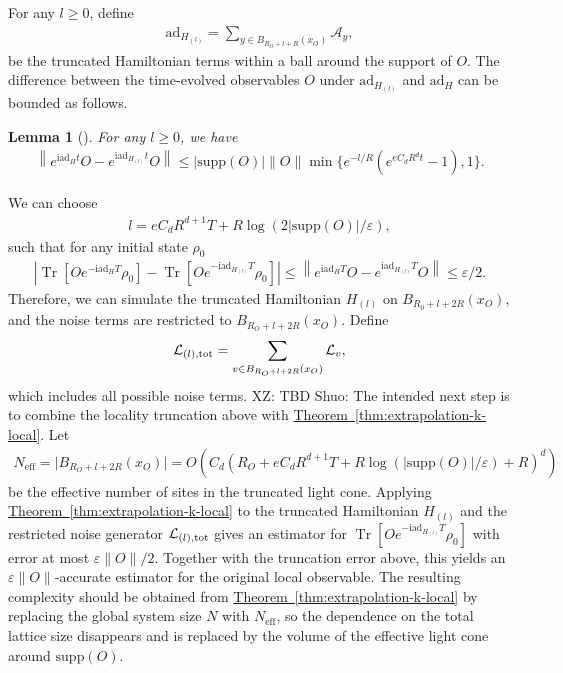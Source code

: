 \documentclass[aps,pra,reprint,groupedaddress,floatfix]{revtex4-2}
\newtheorem{lemma}{Lemma}
\newcommand{\thm}[1]{\hyperref[thm:#1]{Theorem~\ref*{thm:#1}}}
\renewcommand{\i}{\mathrm{i}}
\renewcommand{\L}{\mathcal{L}}
\newcommand{\ad}{\mathrm{ad}}
\newcommand{\A}{\mathcal{A}}
\newcommand{\supp}{\mathrm{supp}}
\newcommand{\eps}{\varepsilon}
\newcommand{\xz}[1]{{\color{cyan} XZ: #1}}
\newcommand{\sz}[1]{{\color{blue} Shuo: #1}}
\begin{document}
For any $l \ge 0$, define\begin{align*}
    \ad_{H_{(l)}} = \sum_{y\in B_{R_O+l+R}(x_O)} \A_y,
\end{align*}
be the truncated Hamiltonian terms within a ball around the support of $O$. The difference between the time-evolved observables $O$ under $\ad_{H_{(l)}}$ and $ \ad_H$ can be bounded as follows. 
\begin{lemma}[{\cite[Lemma 2]{rao2025stability}}]
    For any $l\ge 0$, we have \begin{align*}
        \left\| e^{\i \ad_H t}O - e^{\i \ad_{H_{(l)}}t}O\right\| \le |\supp(O)|\|O\|\min\{e^{-l/R}(e^{eC_dR^d t}-1), 1\}.
    \end{align*}
\end{lemma}
We can choose \begin{align*}
    l = eC_d R^{d+1}T+ R\log(2|\supp(O)|/\eps),
\end{align*}
such that for any initial state $\rho_0$ \begin{align*}
    \left| \operatorname{Tr}[Oe^{-\i \ad_H T}\rho_0]- \operatorname{Tr}[Oe^{-\i \ad_{H_{(l)}} T}\rho_0]\right| \le \left\| e^{\i \ad_HT}O - e^{\i \ad_{H_{(l)}}T}O\right\| \le \eps/2.
\end{align*}
Therefore, we can simulate the truncated Hamiltonian $H_{(l)}$ on $B_{R_0+l+2R}(x_O)$,  and the noise terms are restricted to $B_{R_O+l+2R}(x_O)$. Define
\begin{align*}
     \L_{(l), \rm tot} =  \sum_{v\in B_{R_O+l+2R}(x_O)} \L_v,
\end{align*}
which includes all possible noise terms. 
\xz{TBD}
\sz{The intended next step is to combine the locality truncation above with \thm{extrapolation-k-local}. Let
\begin{align*}
    N_{\mathrm{eff}} = \big|B_{R_O+l+2R}(x_O)\big| = O\!\left(C_d(R_O+eC_dR^{d+1}T+R\log(|\supp(O)|/\eps)+R)^d\right)
\end{align*}
be the effective number of sites in the truncated light cone. Applying \thm{extrapolation-k-local} to the truncated Hamiltonian $H_{(l)}$ and the restricted noise generator $\L_{(l),\rm tot}$ gives an estimator for $\operatorname{Tr}[Oe^{-\i\ad_{H_{(l)}}T}\rho_0]$ with error at most $\eps\|O\|/2$. Together with the truncation error above, this yields an $\eps\|O\|$-accurate estimator for the original local observable. The resulting complexity should be obtained from \thm{extrapolation-k-local} by replacing the global system size $N$ with $N_{\mathrm{eff}}$, so the dependence on the total lattice size disappears and is replaced by the volume of the effective light cone around $\supp(O)$.}
\end{document}
